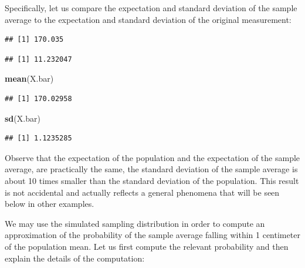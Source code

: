 \documentclass[]{krantz}
\makeatletter
\newenvironment{Shaded}{\begin{snugshade}}{\end{snugshade}}
\newcommand{\KeywordTok}[1]{\textcolor[rgb]{0.13,0.29,0.53}{\textbf{#1}}}
\newcommand{\DecValTok}[1]{\textcolor[rgb]{0.00,0.00,0.81}{#1}}
\newcommand{\OperatorTok}[1]{\textcolor[rgb]{0.81,0.36,0.00}{\textbf{#1}}}
\newcommand{\NormalTok}[1]{#1}
\newenvironment{kframe}{%
\medskip{}
\setlength{\fboxsep}{.8em}
 \def\at@end@of@kframe{}%
 \ifinner\ifhmode%
  \def\at@end@of@kframe{\end{minipage}}%
  \begin{minipage}{\columnwidth}%
 \fi\fi%
 \def\FrameCommand##1{\hskip\@totalleftmargin \hskip-\fboxsep
 \colorbox{shadecolor}{##1}\hskip-\fboxsep
     \hskip-\linewidth \hskip-\@totalleftmargin \hskip\columnwidth}%
 \MakeFramed {\advance\hsize-\width
   \@totalleftmargin\z@ \linewidth\hsize
   \@setminipage}}%
 {\par\unskip\endMakeFramed%
 \at@end@of@kframe}
\renewenvironment{Shaded}{\begin{kframe}}{\end{kframe}}
\theoremstyle{definition}
\theoremstyle{definition}
\theoremstyle{definition}
\theoremstyle{remark}
\makeatother
\begin{document}
Specifically, let us compare the expectation and standard deviation of
the sample average to the expectation and standard deviation of the
original measurement:

\begin{Shaded}
\end{Shaded}

\begin{verbatim}
## [1] 170.035
\end{verbatim}

\begin{Shaded}
\end{Shaded}

\begin{verbatim}
## [1] 11.232047
\end{verbatim}

\begin{Shaded}
\begin{Highlighting}[]
\KeywordTok{mean}\NormalTok{(X.bar)}
\end{Highlighting}
\end{Shaded}

\begin{verbatim}
## [1] 170.02958
\end{verbatim}

\begin{Shaded}
\begin{Highlighting}[]
\KeywordTok{sd}\NormalTok{(X.bar)}
\end{Highlighting}
\end{Shaded}

\begin{verbatim}
## [1] 1.1235285
\end{verbatim}

Observe that the expectation of the population and the expectation of
the sample average, are practically the same, the standard deviation of
the sample average is about 10 times smaller than the standard deviation
of the population. This result is not accidental and actually reflects a
general phenomena that will be seen below in other examples.

We may use the simulated sampling distribution in order to compute an
approximation of the probability of the sample average falling within 1
centimeter of the population mean. Let us first compute the relevant
probability and then explain the details of the computation:
\end{document}
